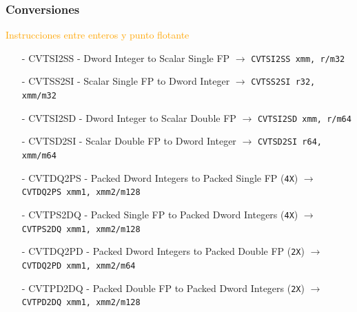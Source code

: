 \documentclass[aspectratio=169]{beamer}
\begin{document}
\begin{frame}[fragile]
	\frametitle{Conversiones}
	\normalsize \textcolor{orange}{Instrucciones entre enteros y punto flotante}\\
	\vspace{0.2cm}
	\footnotesize
	\begin{itemize}
	\item[-] {\color{a}CVT}{\color{v}SI}{\color{orange}2}{\color{v}SS} - Dword Integer to Scalar Single FP $\rightarrow$
	\textcolor{verdeuca}{\texttt{CVTSI2SS xmm, r/m32}}
	\item[-] {\color{a}CVT}{\color{v}SS}{\color{orange}2}{\color{v}SI} - Scalar Single FP to Dword Integer $\rightarrow$
	\textcolor{verdeuca}{\texttt{CVTSS2SI r32, xmm/m32}}
	\end{itemize}
	\begin{itemize}
	\item[-] {\color{a}CVT}{\color{v}SI}{\color{orange}2}{\color{v}SD} - Dword Integer to Scalar Double FP $\rightarrow$
	\textcolor{verdeuca}{\texttt{CVTSI2SD xmm, r/m64}}
	\item[-] {\color{a}CVT}{\color{v}SD}{\color{orange}2}{\color{v}SI} - Scalar Double FP to Dword Integer $\rightarrow$
	\textcolor{verdeuca}{\texttt{CVTSD2SI r64, xmm/m64}}
	\end{itemize}
	\pause
	\begin{itemize}
	\item[-] {\color{a}CVT}{\color{v}DQ}{\color{orange}2}{\color{v}PS} - Packed Dword Integers to Packed Single FP (\texttt{4X}) $\rightarrow$
	\textcolor{verdeuca}{\texttt{CVTDQ2PS xmm1, xmm2/m128}}
	\item[-] {\color{a}CVT}{\color{v}PS}{\color{orange}2}{\color{v}DQ} - Packed Single FP to Packed Dword Integers (\texttt{4X}) $\rightarrow$
	\textcolor{verdeuca}{\texttt{CVTPS2DQ xmm1, xmm2/m128}}
	\end{itemize}
	\begin{itemize}
	\item[-] {\color{a}CVT}{\color{v}DQ}{\color{orange}2}{\color{v}PD} - Packed Dword Integers to Packed Double FP (\texttt{2X}) $\rightarrow$
	\textcolor{verdeuca}{\texttt{CVTDQ2PD xmm1, xmm2/m64}}
	\item[-] {\color{a}CVT}{\color{v}PD}{\color{orange}2}{\color{v}DQ} - Packed Double FP to Packed Dword Integers (\texttt{2X}) $\rightarrow$
	\textcolor{verdeuca}{\texttt{CVTPD2DQ xmm1, xmm2/m128}}
	\end{itemize}
\end{frame}
\end{document}
